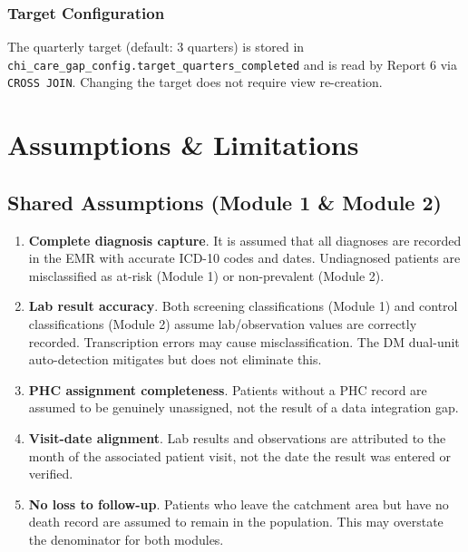 \documentclass[11pt,a4paper]{article}
\begin{document}
\subsubsection{Target Configuration}

The quarterly target (default: 3 quarters) is stored in \texttt{chi\_care\_gap\_config.target\_quarters\_completed} and is read by Report 6 via \texttt{CROSS JOIN}. Changing the target does not require view re-creation.

\section{Assumptions \& Limitations}

\subsection{Shared Assumptions (Module 1 \& Module 2)}

\begin{enumerate}[leftmargin=*, label=\textbf{SA\arabic*}]
    \item \textbf{Complete diagnosis capture}. It is assumed that all diagnoses are recorded in the EMR with accurate ICD-10 codes and dates. Undiagnosed patients are misclassified as at-risk (Module 1) or non-prevalent (Module 2).
    \item \textbf{Lab result accuracy}. Both screening classifications (Module 1) and control classifications (Module 2) assume lab/observation values are correctly recorded. Transcription errors may cause misclassification. The DM dual-unit auto-detection mitigates but does not eliminate this.
    \item \textbf{PHC assignment completeness}. Patients without a PHC record are assumed to be genuinely unassigned, not the result of a data integration gap.
    \item \textbf{Visit-date alignment}. Lab results and observations are attributed to the month of the associated patient visit, not the date the result was entered or verified.
    \item \textbf{No loss to follow-up}. Patients who leave the catchment area but have no death record are assumed to remain in the population. This may overstate the denominator for both modules.
\end{enumerate}
\end{document}
